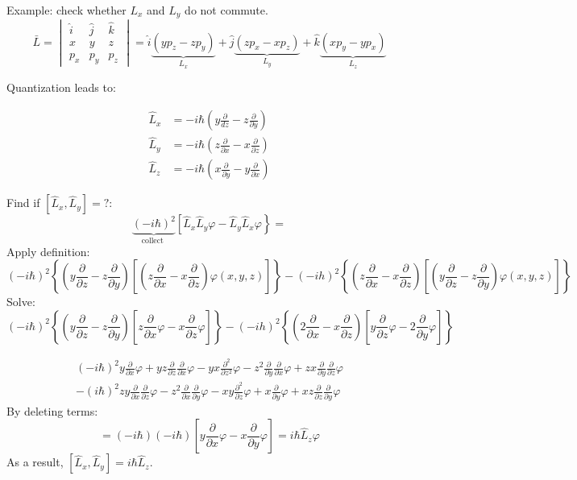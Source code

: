 Example: check whether $L_x$ and $L_y$ do not commute.
$$\bar{L}=\begin{vmatrix}\hat{i}& \hat{j}& \hat{k} \\ x& y& z \\ p_{x}& p_{y}& p_{z}\end{vmatrix}=\hat{i} \underbrace{\left(y p_{z}-z p_{y}\right)}_{L_{x}}+\hat{j}\underbrace{(z p_{x}-x p_{z})}_{L_{y}}+\hat{k} \underbrace{\left(x p_{y}-y p_{x}\right)}_{L_{z}}$$

Quantization leads to:

\begin{align*}
	\hat{L}_{x}&=-i \hbar\left(y \frac{\partial}{d z}-z \frac{\partial}{\partial y}\right) \\
	\hat{L}_{y}&=-i \hbar\left(z \frac{\partial}{\partial x}-x \frac{\partial}{\partial z}\right)\\
	\hat{L}_{z}&=-i \hbar\left(x \frac{\partial}{\partial y}-y \frac{\partial}{\partial x}\right)
\end{align*}

Find if $\left[\hat{L}_{x}, \hat{L}_{y}\right]=?$:
$$
\underbrace{(-i \hbar)^{2}}_{\text {collect }}\left[\hat{L}_{x} \hat{L}_{y} \varphi-\hat{L}_{y} \hat{L}_{x}\varphi\right\}=
$$
Apply definition:
$$
(-i \hbar)^{2}\left\{\left(y \frac{\partial}{\partial z}-z \frac{\partial}{\partial y}\right)\left[\left(z \frac{\partial}{\partial x}-x \frac{\partial}{\partial z}\right) \varphi(x, y, z)\right]\right\}-(-i h)^{2}\left\{\left(z \frac{\partial}{\partial x}-x \frac{\partial}{\partial z}\right)\left[\left(y \frac{\partial}{\partial z}-z \frac{\partial}{\partial y}\right) \varphi(x, y, z)\right]\right\}
$$
Solve:
$$(-i \hbar)^{2}\left\{\left(y \frac{\partial}{\partial z}-z \frac{\partial}{\partial y}\right)\left[z \frac{\partial}{\partial x} \varphi-x \frac{\partial}{\partial z} \varphi\right]\right\}-(-i h)^{2}\left\{\left(2 \frac{\partial}{\partial x}-x \frac{\partial}{\partial z}\right)\left[y \frac{\partial}{\partial z} \varphi-2 \frac{\partial}{\partial y} \varphi\right]\right\}$$

\begin{multline}
(-i \hbar)^{2}{y \frac{\partial}{\partial x} \varphi+y z \frac{\partial}{\partial z} \frac{\partial}{\partial x} \varphi-y x \frac{\partial^{2}}{\partial z^{2}} \varphi-z^{2} \frac{\partial}{\partial y} \frac{\partial}{\partial x} \varphi+z x \frac{\partial}{\partial y} \frac{\partial}{\partial z} \varphi} \\-(i\hbar)^{2}{z y \frac{\partial}{\partial x} \frac{\partial}{\partial z} \varphi-z^{2} \frac{\partial}{\partial x} \frac{\partial}{\partial y} \varphi-x y \frac{\partial^{2}}{\partial z} \varphi+x \frac{\partial}{\partial y} \varphi+x z \frac{\partial}{\partial z} \frac{\partial}{\partial y} \varphi}
\end{multline}
By deleting terms:
$$=(-i \hbar)(-i \hbar)[y \frac{\partial}{\partial x} \varphi-x\frac{\partial}{\partial y}\varphi] = i\hbar \hat{L}_{z}\varphi$$
As a result, $\left[\hat{L}_{x}, \hat{L}_{y}\right]=i\hbar \hat{L}_{z}$.\\

